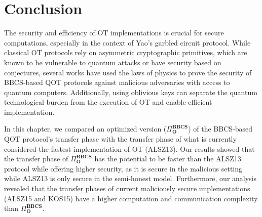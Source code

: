 \section{Conclusion}


The security and efficiency of OT implementations is crucial for secure computations, especially in the context of Yao's garbled circuit protocol. While classical OT protocols rely on asymmetric cryptographic primitives, which are known to be vulnerable to quantum attacks or have security based on conjectures, several works \cite{Lemus20, BCKM21, GLSV21, U10} have used the laws of physics to prove the security of BBCS-based QOT protocols against malicious adversaries with access to quantum computers. Additionally, using oblivious keys can separate the quantum technological burden from the execution of OT and enable efficient implementation.

In this chapter, we compared an optimized version ($\Pi^{\textbf{BBCS}}_{\textbf{O}}$) of the BBCS-based QOT protocol's transfer phase with the transfer phase of what is currently considered the fastest implementation of OT (ALSZ13). Our results showed that the transfer phase of $\Pi^{\textbf{BBCS}}_{\textbf{O}}$ has the potential to be faster than the ALSZ13 protocol while offering higher security, as it is secure in the malicious setting while ALSZ13 is only secure in the semi-honest model. Furthermore, our analysis revealed that the transfer phases of current maliciously secure implementations (ALSZ15 and KOS15) have a higher computation and communication complexity than $\Pi^{\textbf{BBCS}}_{\textbf{O}}$.

%
%
%
